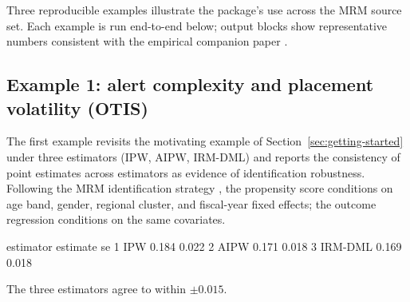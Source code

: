 \documentclass[article,shortnames,nojss]{jss}
\newcommand{\OTIS}{\textsf{OTIS}}
\begin{document}
Three reproducible examples illustrate the package's use across
the MRM source set.  Each example is run end-to-end below; output
blocks show representative numbers consistent with the empirical
companion paper \citep{Ruhela2026MorieEmpirical}.

\subsection[Example 1: alert complexity and placement volatility (OTIS)]{Example 1: alert complexity and placement volatility (\OTIS{})}

The first example revisits the motivating example of
Section~\ref{sec:getting-started} under three estimators
(IPW, AIPW, IRM-DML) and reports the consistency of point
estimates across estimators as evidence of identification
robustness. Following the MRM identification strategy
\citep{Ruhela2026MRM}, the propensity score conditions on age band,
gender, regional cluster, and fiscal-year fixed effects; the
outcome regression conditions on the same covariates.


\begin{Code}
  estimator  estimate     se
1       IPW     0.184  0.022
2      AIPW     0.171  0.018
3   IRM-DML     0.169  0.018
\end{Code}

The three estimators agree to within $$.
\end{document}

